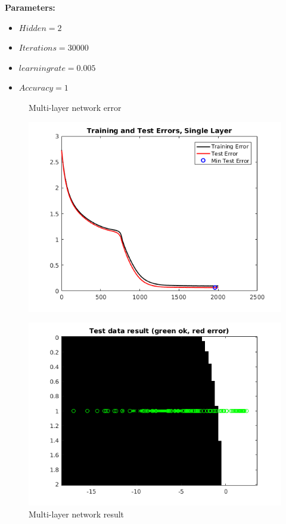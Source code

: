 \documentclass[a4paper,12pt]{article}
\begin{document}
\textbf{Parameters:}
\begin{itemize}
\item $Hidden = 2$
\item $Iterations = 30000$
\item $learning rate = 0.005$
\item $Accuracy = 1$
\end{itemize}

\begin{figure}[H]
\centering
  \begin{minipage}[]{0.49\textwidth}
  \caption{Multi-layer network error}\label{fig:singlemulti_2_error}
  \includegraphics[width=\textwidth]{figures/multi_2_error.png}
  \end{minipage}
  \begin{minipage}[]{0.49\textwidth}
  \caption{Multi-layer network result}\label{fig:multi_2_test}
  \includegraphics[width=\textwidth]{figures/multi_2_test.png}
  \end{minipage}
\end{figure}
\end{document}
